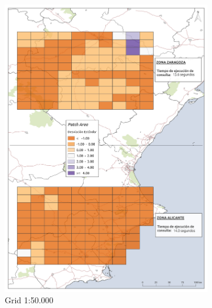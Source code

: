 \begin{figure}
\begin{subfigure}[b]{0.4\textwidth}
    \includegraphics[width=\textwidth]{ResultadosyDiscusion/Figs/Results/p_50.pdf}
    \caption{Grid 1:50.000}
    \label{fig:p_50}
  \end{subfigure}             
  \begin{subfigure}[b]{0.4\textwidth}

\end{subfigure}
\end{figure}
